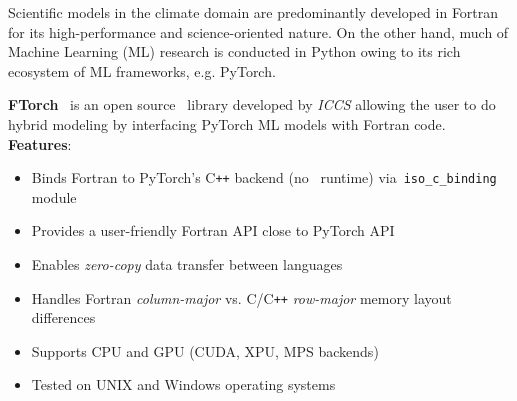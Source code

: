 Scientific models in the climate domain are predominantly developed in Fortran for its high-performance and science-oriented nature. On the other hand, much of Machine Learning (ML) research is conducted in Python owing to its rich ecosystem of ML frameworks, e.g. PyTorch. 

\textbf{FTorch}~\citep{Atkinson2025} is an open source \href{https://github.com/Cambridge-ICCS/FTorch}{\textcolor{black}{\faGithub}}~library developed by \emph{ICCS} allowing the user to do hybrid modeling by interfacing PyTorch ML models with Fortran code. \\
\textbf{Features}:
\begin{itemize}
    \item Binds Fortran to PyTorch's C\texttt{++} backend (no \faPython~runtime) via~\texttt{iso\_c\_binding} module
    \item Provides a user-friendly Fortran API close to PyTorch API
    \item Enables \emph{zero-copy} data transfer between languages
    \item Handles Fortran \emph{column-major} vs. C/C\texttt{++} \emph{row-major} memory layout differences
    \item Supports CPU and GPU (CUDA, XPU, MPS backends)
    \item Tested on UNIX and Windows operating systems
\end{itemize}

